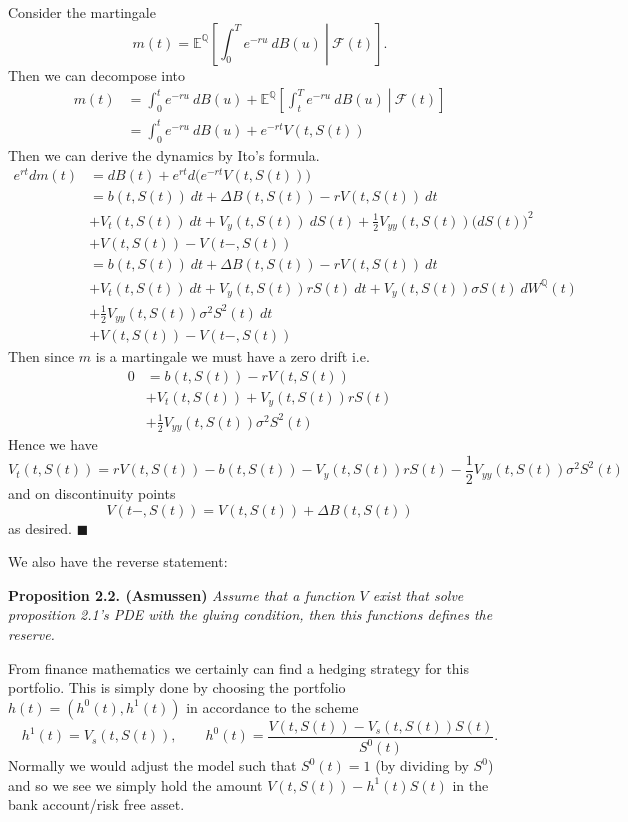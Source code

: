 \documentclass[
]{book}
\begin{document}
Consider the martingale
\[
m(t)=\mathbb E^{\mathbb Q}\left[\left. \int_0^Te^{-ru}\ dB(u)\ \right\vert\ \mathcal F(t)\right].
\]
Then we can decompose into
\begin{align*}
m(t)&=\int_0^te^{-ru}\ dB(u)+\mathbb E^{\mathbb Q}\left[\left. \int_t^Te^{-ru}\ dB(u)\ \right\vert\ \mathcal F(t)\right]\\
&=\int_0^te^{-ru}\ dB(u)+e^{-rt}V(t,S(t))
\end{align*}
Then we can derive the dynamics by Ito's formula.
\begin{align*}
e^{rt}dm(t)&=dB(t)+e^{rt}d\Big(e^{-rt}V(t,S(t))\Big)\\
&=b(t,S(t))\ dt+\Delta B(t,S(t))-rV(t,S(t))\ dt\\
&+V_t(t,S(t))\ dt+V_y(t,S(t))\ dS(t)+\frac{1}{2}V_{yy}(t,S(t))\big(dS(t)\big)^2\\
&+V(t,S(t))-V(t-,S(t))\\
&=b(t,S(t))\ dt+\Delta B(t,S(t))-rV(t,S(t))\ dt\\
&+V_t(t,S(t))\ dt+V_y(t,S(t))rS(t)\ dt + V_y(t,S(t))\sigma S(t)\ dW^\mathbb Q(t)\\
&+\frac{1}{2}V_{yy}(t,S(t))\sigma^2S^2(t)\ dt\\
&+V(t,S(t))-V(t-,S(t))
\end{align*}
Then since \(m\) is a martingale we must have a zero drift i.e.
\begin{align*}
0&=b(t,S(t))-rV(t,S(t))\\
&+V_t(t,S(t))+V_y(t,S(t))rS(t)\\
&+\frac{1}{2}V_{yy}(t,S(t))\sigma^2S^2(t)
\end{align*}
Hence we have
\[
V_t(t,S(t))=rV(t,S(t))-b(t,S(t))-V_y(t,S(t))rS(t)-\frac{1}{2}V_{yy}(t,S(t))\sigma^2S^2(t)
\]
and on discontinuity points
\[
V(t-,S(t))=V(t,S(t))+\Delta B(t,S(t))
\]
as desired. \(\blacksquare\)

We also have the reverse statement:

\textbf{Proposition 2.2. (Asmussen)} \emph{Assume that a function \(V\) exist that solve proposition 2.1's PDE with the gluing condition, then this functions defines the reserve.}

From finance mathematics we certainly can find a hedging strategy for this portfolio. This is simply done by choosing the portfolio \(h(t)=(h^0(t),h^1(t))\) in accordance to the scheme
\[
h^1(t)=V_s(t,S(t)),\qquad h^0(t)=\frac{V(t,S(t))-V_s(t,S(t))S(t)}{S^0(t)}.
\]
Normally we would adjust the model such that \(S^0(t)=1\) (by dividing by \(S^0\)) and so we see we simply hold the amount \(V(t,S(t))-h^1(t)S(t)\) in the bank account/risk free asset.
\end{document}
